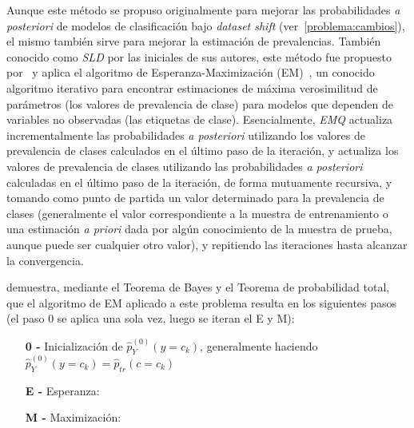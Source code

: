 Aunque este método se propuso originalmente para mejorar las probabilidades {\it
a posteriori\/} de modelos de clasificación bajo {\it dataset shift\/}
(ver~\ref{problema:cambios}), el mismo también sirve para mejorar la estimación
de prevalencias. También conocido como {\it SLD\/} por las iniciales de sus
autores, este método fue propuesto por~\citet{saerens2002adjusting} y aplica el
algoritmo de Esperanza-Maximización (EM)~\cite{dempster1977maximum}, un conocido
algoritmo iterativo para encontrar estimaciones de máxima verosimilitud de
parámetros (los valores de prevalencia de clase) para modelos que dependen de
variables no observadas (las etiquetas de clase). Esencialmente, {\it EMQ\/}
actualiza incrementalmente las probabilidades {\it a posteriori\/} utilizando
los valores de prevalencia de clases calculados en el último paso de la
iteración, y actualiza los valores de prevalencia de clases utilizando las
probabilidades {\it a posteriori\/} calculadas en el último paso de la
iteración, de forma mutuamente recursiva, y tomando como punto de partida un
valor determinado para la prevalencia de clases (generalmente el valor
correspondiente a la muestra de entrenamiento o una estimación {\it a priori\/}
dada por algún conocimiento de la muestra de prueba, aunque puede ser cualquier
otro valor), y repitiendo las iteraciones hasta alcanzar la convergencia.

\citet[Apéndice, p.23 a p.25]{saerens2002adjusting} demuestra, mediante el
Teorema de Bayes y el Teorema de probabilidad total, que el algoritmo de EM
aplicado a este problema resulta en los siguientes pasos (el paso 0 se aplica
una sola vez, luego se iteran el E y M):

\begin{enumerate}[leftmargin=*, labelindent=16pt]

    \item[\bf{0 -}] Inicialización de \(\hat p^{(0)}_{Y}(y=c_k)\), generalmente
    haciendo \(\hat p^{(0)}_{Y}(y=c_k) = \hat p_{tr}(c=c_k)\)

    \item[\bf{E -}] Esperanza: \hspace*{\fill}

    \item[\bf{M -}] Maximización: \hspace*{\fill}

\end{enumerate}

